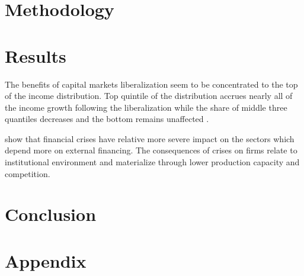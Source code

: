\documentclass[a4paper,11pt]{article}
\begin{document}



%
%
\section{Methodology}

\section{Results}
The benefits of capital markets liberalization seem to be concentrated to the top of the income distribution. Top quintile of the distribution accrues nearly all of the income growth following the liberalization while the share of middle three quantiles decreases and the bottom remains unaffected \citep{das2003income}.

\citet{kroszneretal2007} show that financial crises have relative more severe impact on the sectors which depend more on external financing. The consequences of crises on firms relate to institutional environment and materialize through lower production capacity and competition.

\section{Conclusion}
\label{sec:conclusion}

\clearpage
%


%
\clearpage
%
\section{Appendix}
\label{sec:app}
\end{document}
